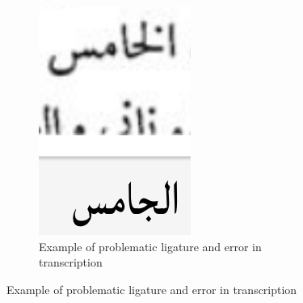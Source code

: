 \begin{figure}[h]
	\begin{subfigure}[b]{0.3\linewidth}
	\centering
	\includegraphics[width=\linewidth]{images/image23.png}
	\caption{Example of problematic ligature and error in transcription}
	\label{fig:fig10}
	\end{subfigure}


\end{figure}
